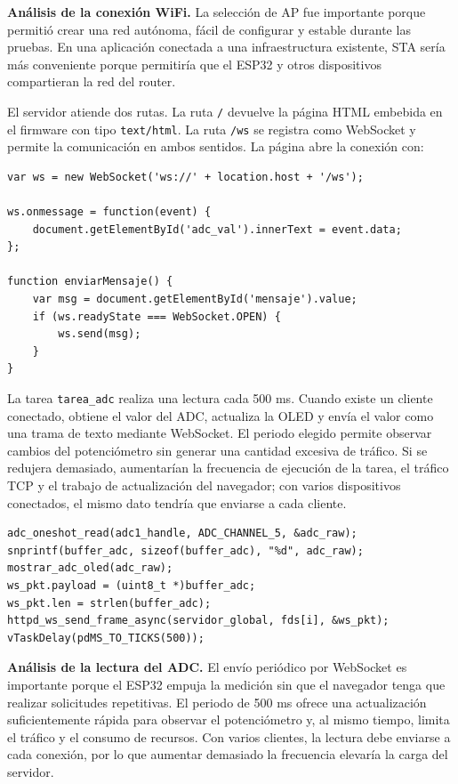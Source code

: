 \documentclass[12pt, letterpaper]{article}
\begin{document}
\textbf{Análisis de la conexión WiFi.} La selección de AP fue importante porque permitió crear una red autónoma, fácil de configurar y estable durante las pruebas. En una aplicación conectada a una infraestructura existente, STA sería más conveniente porque permitiría que el ESP32 y otros dispositivos compartieran la red del router.

El servidor atiende dos rutas. La ruta \texttt{/} devuelve la página HTML
embebida en el firmware con tipo \texttt{text/html}. La ruta \texttt{/ws} se
registra como WebSocket y permite la comunicación en ambos sentidos. La página
abre la conexión con:

\begin{lstlisting}[style=cstyle, caption={Apertura de la conexión WebSocket en el navegador}, label={lst:websocket-js}]
var ws = new WebSocket('ws://' + location.host + '/ws');

ws.onmessage = function(event) {
	document.getElementById('adc_val').innerText = event.data;
};

function enviarMensaje() {
	var msg = document.getElementById('mensaje').value;
	if (ws.readyState === WebSocket.OPEN) {
		ws.send(msg);
	}
}
\end{lstlisting}

La tarea \texttt{tarea\_adc} realiza una lectura cada 500 ms. Cuando existe un
cliente conectado, obtiene el valor del ADC, actualiza la OLED y envía el valor
como una trama de texto mediante WebSocket. El periodo elegido permite observar
cambios del potenciómetro sin generar una cantidad excesiva de tráfico. Si se
redujera demasiado, aumentarían la frecuencia de ejecución de la tarea, el
tráfico TCP y el trabajo de actualización del navegador; con varios
dispositivos conectados, el mismo dato tendría que enviarse a cada cliente.

\begin{lstlisting}[style=cstyle, caption={Lectura periódica y envío del valor del ADC}, label={lst:adc-websocket}]
adc_oneshot_read(adc1_handle, ADC_CHANNEL_5, &adc_raw);
snprintf(buffer_adc, sizeof(buffer_adc), "%d", adc_raw);
mostrar_adc_oled(adc_raw);
ws_pkt.payload = (uint8_t *)buffer_adc;
ws_pkt.len = strlen(buffer_adc);
httpd_ws_send_frame_async(servidor_global, fds[i], &ws_pkt);
vTaskDelay(pdMS_TO_TICKS(500));
\end{lstlisting}

\textbf{Análisis de la lectura del ADC.} El envío periódico por WebSocket es importante porque el ESP32 empuja la medición sin que el navegador tenga que realizar solicitudes repetitivas. El periodo de 500 ms ofrece una actualización suficientemente rápida para observar el potenciómetro y, al mismo tiempo, limita el tráfico y el consumo de recursos. Con varios clientes, la lectura debe enviarse a cada conexión, por lo que aumentar demasiado la frecuencia elevaría la carga del servidor.
\end{document}
